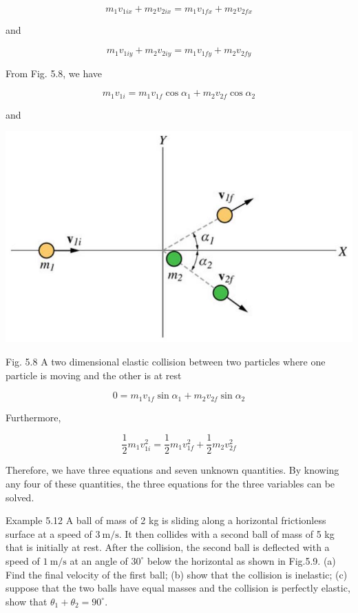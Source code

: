 \documentclass[10pt]{article}
\begin{document}
$$
m_{1} v_{1 i x}+m_{2} v_{2 i x}=m_{1} v_{1 f x}+m_{2} v_{2 f x}
$$

and

$$
m_{1} v_{1 i y}+m_{2} v_{2 i y}=m_{1} v_{1 f y}+m_{2} v_{2 f y}
$$

From Fig. 5.8, we have

$$
m_{1} v_{1 i}=m_{1} v_{1 f} \cos \alpha_{1}+m_{2} v_{2 f} \cos \alpha_{2}
$$

and

\begin{center}
\includegraphics[max width=\textwidth]{2024_09_13_db1f357d2aad0a03eb2eg-088(1)}
\end{center}

Fig. 5.8 A two dimensional elastic collision between two particles where one particle is moving and the other is at rest

$$
0=m_{1} v_{1 f} \sin \alpha_{1}+m_{2} v_{2 f} \sin \alpha_{2}
$$

Furthermore,

$$
\frac{1}{2} m_{1} v_{1 i}^{2}=\frac{1}{2} m_{1} v_{1 f}^{2}+\frac{1}{2} m_{2} v_{2 f}^{2}
$$

Therefore, we have three equations and seven unknown quantities. By knowing any four of these quantities, the three equations for the three variables can be solved.

Example 5.12 A ball of mass of 2 kg is sliding along a horizontal frictionless surface at a speed of $3 \mathrm{~m} / \mathrm{s}$. It then collides with a second ball of mass of 5 kg that is initially at rest. After the collision, the second ball is deflected with a speed of $1 \mathrm{~m} / \mathrm{s}$ at an angle of $30^{\circ}$ below the horizontal as shown in Fig.5.9. (a) Find the final velocity of the first ball; (b) show that the collision is inelastic; (c) suppose that the two balls have equal masses and the collision is perfectly elastic, show that $\theta_{1}+\theta_{2}=90^{\circ}$.
\end{document}
